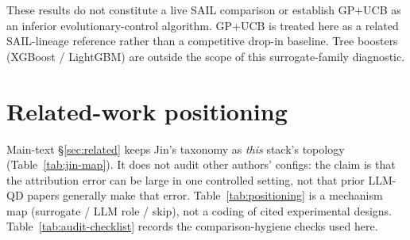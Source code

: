 These results do not constitute a live SAIL comparison or establish GP+UCB as an inferior evolutionary-control algorithm. GP+UCB is treated here as a related SAIL-lineage reference rather than a competitive drop-in baseline. Tree boosters (XGBoost / LightGBM) are outside the scope of this surrogate-family diagnostic.

\section{Related-work positioning}
\label{sec:positioning-appendix}

Main-text \S\ref{sec:related} keeps Jin's taxonomy as \emph{this} stack's topology (Table~\ref{tab:jin-map}). It does not audit other authors' configs: the claim is that the attribution error can be large in one controlled setting, not that prior LLM-QD papers generally make that error. Table~\ref{tab:positioning} is a mechanism map (surrogate / LLM role / skip), not a coding of cited experimental designs. Table~\ref{tab:audit-checklist} records the comparison-hygiene checks used here.

\begin{table}[!htbp]
  \centering
  \caption{Jin~(2005) evolution-control vocabulary~\cite{jin2005fitness} $\leftrightarrow$ surrogate roles used in this audit. Mapping is pipeline topology, not a claim that we tested a general before-generation channel. H1 is redundant parent-level scalar augmentation (true parent fitness is already in the prompt).}
  \label{tab:jin-map}
  \small
\end{table}

